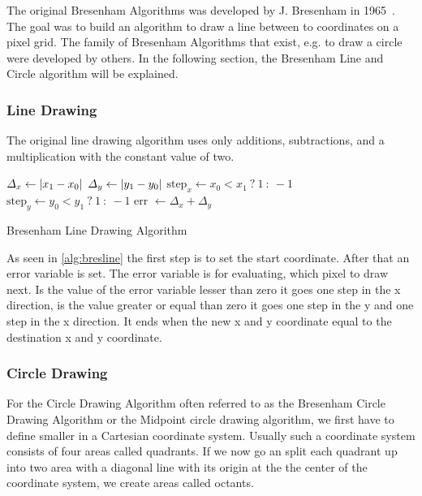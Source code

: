 The original Bresenham Algorithms was developed by J. Bresenham in 1965~\cite{Bresenham65Line}. The goal was to build an algorithm to draw a line between to coordinates on a pixel grid. The family of Bresenham Algorithms that exist, e.g. to draw a circle were developed by others. In the following section, the Bresenham Line and Circle algorithm will be explained.
\subsubsection*{Line Drawing}
The original line drawing algorithm uses only additions, subtractions, and a multiplication with the constant value of two.

\begin{algorithm}[H]
	\SetAlgoLined
	\(\varDelta_x \gets \lvert x_1 - x_0\rvert\)\;
	\(\varDelta_y \gets \lvert y_1 - y_0\rvert\)\;
	\(\text{step}_x \gets x_0 < x_1~ ? ~1 ~:~ -1 \)\;
	\(\text{step}_y \gets y_0 < y_1~ ?~ 1 ~:~ -1\)\;
	err \( \gets \varDelta_x + \varDelta_y \)	
	\caption{Bresenham Line Drawing Algorithm}
	\label{alg:bresline}
\end{algorithm}

As seen in \cref{alg:bresline} the first step is to set the start coordinate. After that an error variable is set. The error variable is for evaluating, which pixel to draw next. Is the value of the error variable lesser than zero it goes one step in the x direction, is the value greater or equal than zero it goes one step in the y and one step in the x direction. It ends when the new x and y coordinate equal to the destination x and y coordinate.
 
\subsubsection*{Circle Drawing}
For the Circle Drawing Algorithm often referred to as the Bresenham Circle Drawing Algorithm or the Midpoint circle drawing algorithm, we first have to define smaller in a Cartesian coordinate system. Usually such a coordinate system consists of four areas called quadrants. If we now go an split each quadrant up into two area with a diagonal line with its origin at the the center of the coordinate system, we create areas called octants.

